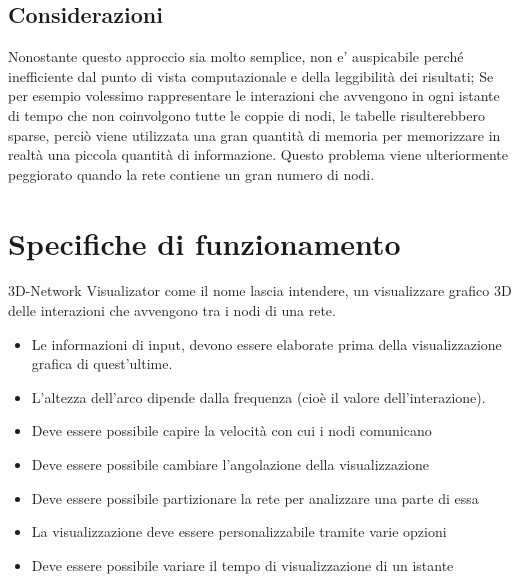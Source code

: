 \documentclass[a4paper,12pt]{article}
\begin{document}
\subsection{Considerazioni}
Nonostante questo approccio sia molto semplice, non e' auspicabile perché inefficiente dal punto di vista computazionale e della leggibilità dei risultati; Se per esempio volessimo rappresentare le interazioni che avvengono in ogni istante di tempo che non coinvolgono tutte le coppie di nodi, le tabelle risulterebbero sparse, perci\`o viene utilizzata una gran quantità di memoria per memorizzare in realtà una piccola quantità di informazione. Questo problema viene ulteriormente peggiorato quando la rete contiene un gran numero di nodi.

\section{Specifiche di funzionamento}
3D-Network Visualizator come il nome lascia intendere, un visualizzare grafico 3D delle interazioni che avvengono tra i nodi di una rete.
\begin{itemize}
 \item Le informazioni di input, devono essere elaborate prima della visualizzazione grafica di quest'ultime.
 \item L'altezza dell'arco dipende dalla frequenza (cio\`e il valore dell'interazione).
 \item Deve essere possibile capire la velocità con cui i nodi comunicano
 \item Deve essere possibile cambiare l'angolazione della visualizzazione
 \item Deve essere possibile partizionare la rete per analizzare una parte di essa
 \item La visualizzazione  deve essere personalizzabile tramite varie opzioni
 \item Deve essere possibile variare il tempo di visualizzazione di un istante
\end{itemize}
 
\end{document}
